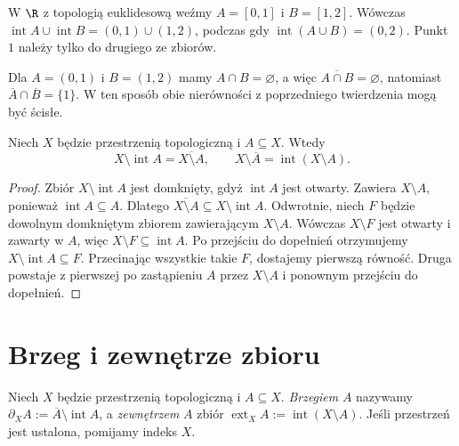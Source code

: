 \begin{przyklad}
\label{ex:topog-scisle-zawierania}
W $\R$ z topologią euklidesową weźmy
$A=[0,1]$ i $B=[1,2]$. Wówczas
$\operatorname{int}A\cup\operatorname{int}B
=(0,1)\cup(1,2)$, podczas gdy
$\operatorname{int}(A\cup B)=(0,2)$.
Punkt $1$ należy tylko do drugiego ze zbiorów.

Dla $A=(0,1)$ i $B=(1,2)$ mamy $A\cap B=\varnothing$,
a więc $\overline{A\cap B}=\varnothing$,
natomiast $\overline A\cap\overline B=\{1\}$.
W ten sposób obie nierówności z poprzedniego
twierdzenia mogą być ścisłe.
\end{przyklad}

\begin{stwierdzenie}
\label{prop:topog-dualnosc-wnetrze-domkniecie}
Niech $X$ będzie przestrzenią topologiczną i $A\subseteq X$.
Wtedy
\[
X\setminus\operatorname{int}A=\overline{X\setminus A},
\qquad
X\setminus\overline A=\operatorname{int}(X\setminus A).
\]
\end{stwierdzenie}
\begin{proof}
Zbiór $X\setminus\operatorname{int}A$ jest domknięty,
gdyż $\operatorname{int}A$ jest otwarty. Zawiera
$X\setminus A$, ponieważ $\operatorname{int}A\subseteq A$.
Dlatego $\overline{X\setminus A}\subseteq
X\setminus\operatorname{int}A$.
Odwrotnie, niech $F$ będzie dowolnym domkniętym
zbiorem zawierającym $X\setminus A$. Wówczas
$X\setminus F$ jest otwarty i zawarty w $A$,
więc $X\setminus F\subseteq\operatorname{int}A$.
Po przejściu do dopełnień otrzymujemy
$X\setminus\operatorname{int}A\subseteq F$.
Przecinając wszystkie takie $F$, dostajemy pierwszą równość.
Druga powstaje z pierwszej po zastąpieniu $A$ przez
$X\setminus A$ i ponownym przejściu do dopełnień.
\end{proof}

\section{Brzeg i zewnętrze zbioru}
\label{sec:topog-brzeg-zewnetrze}

\begin{definicja}
\label{def:topog-brzeg-zewnetrze}
Niech $X$ będzie przestrzenią topologiczną i $A\subseteq X$.
\emph{Brzegiem} $A$ nazywamy
$\partial_X A:=\overline A\setminus\operatorname{int}A$,
a \emph{zewnętrzem} $A$ zbiór
$\operatorname{ext}_X A:=\operatorname{int}(X\setminus A)$.
Jeśli przestrzeń jest ustalona, pomijamy indeks $X$.
\end{definicja}

